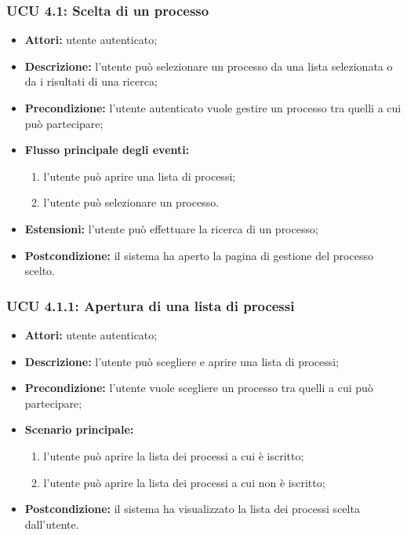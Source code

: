 \subsubsection{UCU 4.1: Scelta di un processo}
\begin{itemize}
\item \textbf{Attori:} utente autenticato;
\item \textbf{Descrizione:} l'utente può selezionare un processo da una lista selezionata o da i risultati di una ricerca;
\item \textbf{Precondizione:} l'utente autenticato vuole gestire un processo tra quelli a cui può partecipare;
\item \textbf{Flusso principale degli eventi:}\
\begin{enumerate}
\item l'utente può aprire una lista di processi;
\item l'utente può selezionare un processo.
\end{enumerate}
\item \textbf{Estensioni:} l'utente può effettuare la ricerca di un processo;
\item \textbf{Postcondizione:} il sistema ha aperto la pagina di gestione del processo scelto.
\end{itemize}

\subsubsection{UCU 4.1.1: Apertura di una lista di processi}
\begin{itemize}
\item \textbf{Attori:} utente autenticato;
\item \textbf{Descrizione:} l'utente può scegliere e aprire una lista di processi;
\item \textbf{Precondizione:} l'utente vuole scegliere un processo tra quelli a cui può partecipare;
\item \textbf{Scenario principale:}\
\begin{enumerate}
\item l'utente può aprire la lista dei processi a cui è iscritto;
\item l'utente può aprire la lista dei processi a cui non è iscritto;
\end{enumerate}
\item \textbf{Postcondizione:} il sistema ha visualizzato la lista dei processi scelta dall'utente.
\end{itemize}

